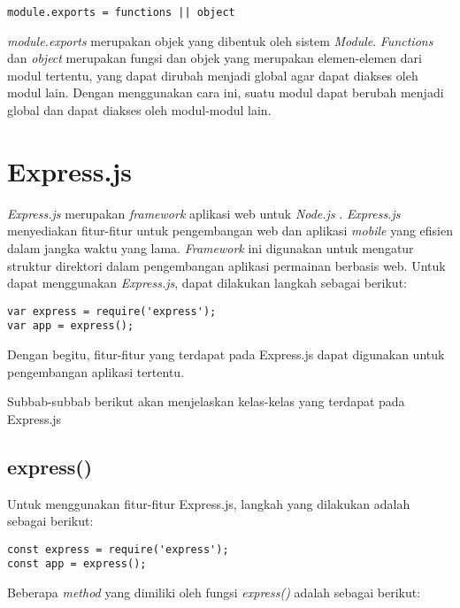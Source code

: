 \begin{lstlisting}
module.exports = functions || object
\end{lstlisting}

\textit{module.exports} merupakan objek yang dibentuk oleh sistem \textit{Module}. \textit{Functions} dan \textit{object} merupakan fungsi dan objek yang merupakan elemen-elemen dari modul tertentu, yang dapat dirubah menjadi global agar dapat diakses oleh modul lain. Dengan menggunakan cara ini, suatu modul dapat berubah menjadi global dan dapat diakses oleh modul-modul lain.


\section{Express.js}
\label{sec:Express.js}

\textit{Express.js} merupakan \textit{framework} aplikasi web untuk \textit{Node.js} \cite{tj:10:expressjs}. \textit{Express.js} menyediakan fitur-fitur untuk pengembangan web dan aplikasi \textit{mobile} yang efisien dalam jangka waktu yang lama. \textit{Framework} ini digunakan untuk mengatur struktur direktori dalam pengembangan aplikasi permainan berbasis web. Untuk dapat menggunakan \textit{Express.js}, dapat dilakukan langkah sebagai berikut: 
\begin{lstlisting}
var express = require('express');
var app = express();
\end{lstlisting}

Dengan begitu, fitur-fitur yang terdapat pada Express.js dapat digunakan untuk pengembangan aplikasi tertentu.

Subbab-subbab berikut akan menjelaskan kelas-kelas yang terdapat pada Express.js

\subsection{express()}
Untuk menggunakan fitur-fitur Express.js, langkah yang dilakukan adalah sebagai berikut:
\begin{lstlisting}
const express = require('express');
const app = express();
\end{lstlisting}

Beberapa \textit{method} yang dimiliki oleh fungsi \textit{express()} adalah sebagai berikut:

